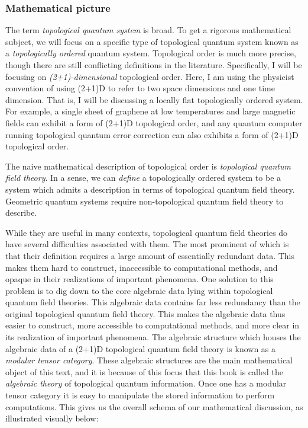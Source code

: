 \documentclass{article}
\theoremstyle{definition}
\numberwithin{figure}{section}
\begin{document}
\subsubsection{Mathematical picture}

The term \textit{topological quantum system} is broad. To get a rigorous mathematical subject, we will focus on a specific type of topological quantum system known as a \textit{topologically ordered} quantum system. Topological order is much more precise, though there are still conflicting definitions in the literature. Specifically, I will be focusing on \textit{(2+1)-dimensional} topological order. Here, I am using the physicist convention of using (2+1)D to refer to two space dimensions and one time dimension. That is, I will be discussing a locally flat topologically ordered system. For example, a single sheet of graphene at low temperatures and large magnetic fields can exhibit a form of (2+1)D topological order, and any quantum computer running topological quantum error correction can also exhibits a form of (2+1)D topological order.

\begin{center}
\end{center}

The naive mathematical description of topological order is \textit{topological quantum field theory}. In a sense, we can \textit{define} a topologically ordered system to be a system which admits a description in terms of topological quantum field theory. Geometric quantum systems require non-topological quantum field theory to describe.

While they are useful in many contexts, topological quantum field theories do have several difficulties associated with them. The most prominent of which is that their definition requires a large amount of essentially redundant data. This makes them hard to construct, inaccessible to computational methods, and opaque in their realizations of important phenomena. One solution to this problem is to dig down to the core algebraic data lying within topological quantum field theories. This algebraic data contains far less redundancy than the original topological quantum field theory. This makes the algebraic data thus easier to construct, more accessible to computational methods, and more clear in its realization of important phenomena. The algebraic structure which houses the algebraic data of a (2+1)D topological quantum field theory is known as a \textit{modular tensor category}. These algebraic structures are the main mathematical object of this text, and it is because of this focus that this book is called the \textit{algebraic theory} of topological quantum information. Once one has a modular tensor category it is easy to manipulate the stored information to perform computations. This gives us the overall schema of our mathematical discussion, as illustrated visually below:
\end{document}
